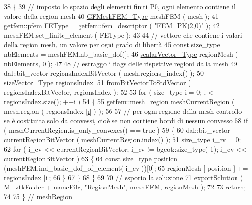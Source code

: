 \begin{DoxyCode}
38 \{
39     \textcolor{comment}{// imposto lo spazio degli elementi finiti P0, ogni elemento contiene il valore della region mesh }
40     \hyperlink{Core_8h_ae7bbd1c30a789b1da88f5459e0b70ab5}{GFMeshFEM\_Type} meshFEM ( mesh );
41     getfem::pfem FEType = getfem::fem\_descriptor ( \textcolor{stringliteral}{"FEM\_PK(2,0)"} );
42     meshFEM.set\_finite\_element ( FEType );
43 
44     \textcolor{comment}{// vettore che contiene i valori della region mesh, un valore per ogni grado di libertà}
45     \textcolor{keyword}{const} size\_type nbElements = meshFEM.nb\_basic\_dof();
46     \hyperlink{Core_8h_a4e75b5863535ba1dd79942de2846eff0}{scalarVector\_Type} regionMesh ( nbElements, 0 );
47 
48     \textcolor{comment}{// estraggo i flags delle rispettive regioni dalla mesh}
49     dal::bit\_vector regionsIndexBitVector ( mesh.regions\_index() );
50     \hyperlink{Core_8h_a83c51913d041a5001e8683434c09857f}{sizeVector\_Type} regionsIndex;
51     \hyperlink{UsefulFunctions_8h_a0ea0b08a12a1e6a94718cf3bcd60edeb}{fromBitVectorToStdVector} ( regionsIndexBitVector, regionsIndex );
52 
53     \textcolor{keywordflow}{for} ( size\_type \hyperlink{matrici_8m_a6f6ccfcf58b31cb6412107d9d5281426}{i} = 0; \hyperlink{matrici_8m_a6f6ccfcf58b31cb6412107d9d5281426}{i} < regionsIndex.size(); ++\hyperlink{matrici_8m_a6f6ccfcf58b31cb6412107d9d5281426}{i} )
54     \{
55         getfem::mesh\_region meshCurrentRegion ( mesh.region ( regionsIndex [\hyperlink{matrici_8m_a6f6ccfcf58b31cb6412107d9d5281426}{i}] ) );
56         
57         \textcolor{comment}{// per ogni regione della mesh controllo se è costituita solo da convessi, cioè se non contiene
       bordi di nessun convesso}
58         \textcolor{keywordflow}{if} ( meshCurrentRegion.is\_only\_convexes() == true )
59         \{
60             dal::bit\_vector currentRegionBitVector ( meshCurrentRegion.index() );
61             size\_type i\_cv = 0;
62             \textcolor{keywordflow}{for} ( i\_cv << currentRegionBitVector; i\_cv != bgeot::size\_type(-1); i\_cv << 
      currentRegionBitVector )
63             \{
64                 \textcolor{keyword}{const} size\_type position = (meshFEM.ind\_basic\_dof\_of\_element( i\_cv ))[0];
65                 regionMesh [ position ] += regionsIndex [\hyperlink{matrici_8m_a6f6ccfcf58b31cb6412107d9d5281426}{i}];
66             \}
67         \}
68     \}
69 
70     \textcolor{comment}{// esporto la soluzione}
71     \hyperlink{UsefulFunctions_8h_add7b8b88dc68d93addd88b9a4dc6e8bf}{exportSolution} ( M\_vtkFolder + nameFile, \textcolor{stringliteral}{"RegionMesh"}, meshFEM, regionMesh );
72     
73     \textcolor{keywordflow}{return};
74 
75 \} \textcolor{comment}{// meshRegion}
\end{DoxyCode}


